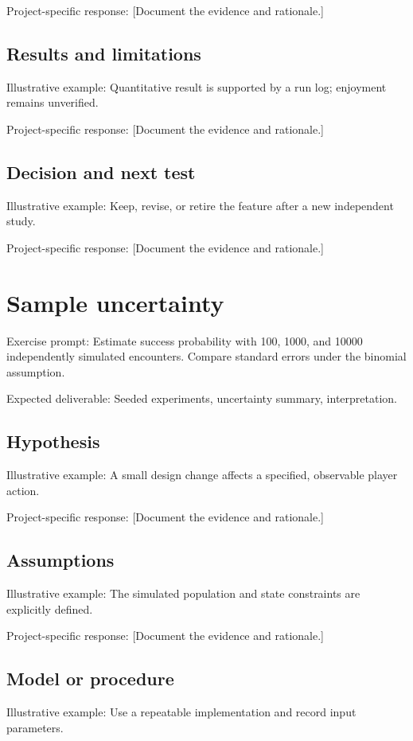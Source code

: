 \documentclass[11pt]{article}
\begin{document}
Project-specific response: [Document the evidence and rationale.]


\subsection{Results and limitations}
Illustrative example: Quantitative result is supported by a run log; enjoyment remains unverified.

Project-specific response: [Document the evidence and rationale.]


\subsection{Decision and next test}
Illustrative example: Keep, revise, or retire the feature after a new independent study.

Project-specific response: [Document the evidence and rationale.]


\section{Sample uncertainty}
Exercise prompt: Estimate success probability with 100, 1000, and 10000 independently simulated encounters. Compare standard errors under the binomial assumption.

Expected deliverable: Seeded experiments, uncertainty summary, interpretation.


\subsection{Hypothesis}
Illustrative example: A small design change affects a specified, observable player action.

Project-specific response: [Document the evidence and rationale.]


\subsection{Assumptions}
Illustrative example: The simulated population and state constraints are explicitly defined.

Project-specific response: [Document the evidence and rationale.]


\subsection{Model or procedure}
Illustrative example: Use a repeatable implementation and record input parameters.
\end{document}
